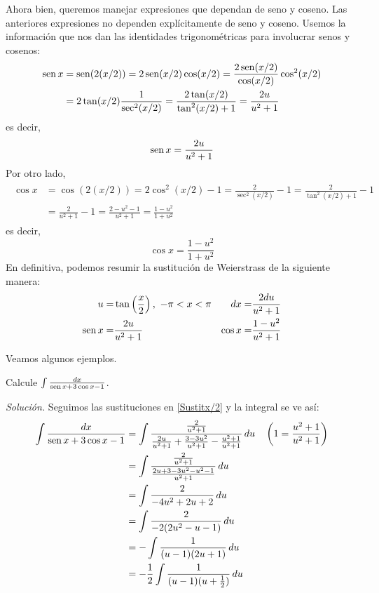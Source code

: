 Ahora bien, queremos manejar expresiones que dependan de seno y coseno. Las anteriores expresiones no dependen explícitamente de seno y coseno. Usemos la información que nos dan las identidades trigonométricas para involucrar senos y cosenos:
\begin{align*}
  \operatorname{sen} x&=\operatorname{sen} (2(x/2)) =2\operatorname{sen} (x/2)\cos (x/2) =\frac{2\operatorname{sen} (x/2)}{\cos (x/2)}\cos^2(x/2) \\
  &=2\tan (x/2)\frac{1}{\sec ^{2}(x/2)} =\frac{2\tan (x/2)}{\tan ^{2}(x/2)+1} =\frac{2u}{u^{2}+1}
\end{align*}
es decir,
\begin{equation}\label{Senox/2}
  \operatorname{sen} x=\frac{2u}{u^{2}+1}
\end{equation}
Por otro lado,
\begin{gather*}
  \begin{aligned}
    \cos x&=\cos (2(x/2)) =2\cos^2(x/2)- 1=\frac{2}{\sec ^{2}(x/2)}-1 =\frac{2}{\tan ^{2}(x/2)+1}-1\\
    &=\frac{2}{u^{2}+1}-1=\frac{2-u^{2}-1}{u^{2}+1}
    =\frac{1-u^{2}}{1+u^{2}}
  \end{aligned}
\end{gather*}
es decir,
\begin{equation}\label{Cosenox/2}
  \cos x=\frac{1-u^{2}}{1+u^{2}}
\end{equation}
En definitiva, podemos resumir la sustitución de Weierstrass de la siguiente manera:
\begin{align}\label{Sustitx/2}
  u= & \tan \left(\frac{x}{2}\right),\ -\pi< x<\pi & dx=& \frac{2du}{u^{2}+1} \\
  \sen x= & \frac{2u}{u^{2}+1} & \cos x= & \frac{1-u^{2}}{u^{2}+1}\notag%
\end{align}

Veamos algunos ejemplos.

\begin{ejemplo}
  Calcule $\int \frac{dx}{\operatorname{sen} x+3\cos x-1}$.
\end{ejemplo}

\emph{Solución.} Seguimos las sustituciones en \eqref{Sustitx/2} y la integral se ve así:
\begin{gather*}
  \begin{aligned}
    \int \frac{dx}{\operatorname{sen} x+3\cos x-1}&=\int \frac{\frac{2}{u^{2}+1}}{\frac{2u}{u^{2}+1}+\frac{3-3u^{2}}{u^{2}+1}-\frac{u^{2}+1}{u^{2}+1}}\, du \quad \left(1=\frac{u^{2}+1}{u^{2}+1}\right) \\
    &=\int \frac{\frac{2}{u^{2}+1}}{\frac{2u+3-3u^{2}-u^{2}-1}{u^{2}+1}}\, du\\
    &=\int \frac{2}{-4u^{2}+2u+2}\, du\\
    &=\int \frac{2}{-2(2u^{2}-u-1)}\, du \\
    &=-\int \frac{1}{(u-1)(2u+1)}\, du \\
    &=-\frac{1}{2}\int \frac{1}{(u-1)(u+\frac{1}{2})}\, du
  \end{aligned}
\end{gather*}

